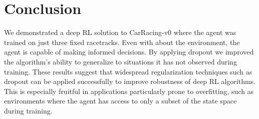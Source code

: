 \documentclass{article}
\begin{document}
\section{Conclusion}
We demonstrated a deep RL solution to CarRacing-v0 where the agent was trained on just three fixed racetracks. Even with about the environment, the agent is capable of making informed decisions. By applying dropout we improved the algorithm's ability to generalize to situations it has not observed during training. These results suggest that widespread regularization techniques such as dropout can be applied successfully to improve robustness of deep RL algorithms. This is especially fruitful in applications particularly prone to overfitting, such as environments where the agent has access to only a subset of the state space during training. 






\end{document}
